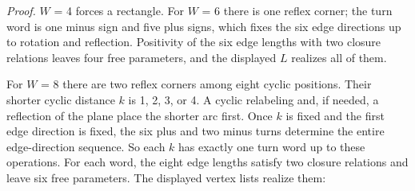 \documentclass[11pt]{article}
\begin{document}
\emph{Proof.} \(W\) = 4 forces a rectangle. For \(W\) = 6 there is one reflex corner; the turn word is one minus sign and five plus signs, which fixes the six edge directions up to rotation and reflection. Positivity of the six edge lengths with two closure relations leaves four free parameters, and the displayed \(L\) realizes all of them.

For \(W\) = 8 there are two reflex corners among eight cyclic positions. Their shorter cyclic distance \(k\) is 1, 2, 3, or 4. A cyclic relabeling and, if needed, a reflection of the plane place the shorter arc first. Once \(k\) is fixed and the first edge direction is fixed, the six plus and two minus turns determine the entire edge-direction sequence. So each \(k\) has exactly one turn word up to these operations. For each word, the eight edge lengths satisfy two closure relations and leave six free parameters. The displayed vertex lists realize them:
\end{document}
